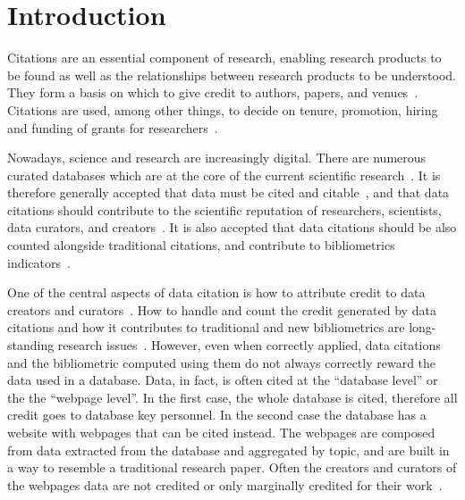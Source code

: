 
\section{Introduction}

Citations are an essential component of research, enabling research products to be found as well as the relationships between research products to be understood. 
They form a basis on which to give credit to authors, papers, and venues~\citep{ZouP16, cousijn2019bringing, cronin1984}.
Citations are used, among other things, to decide on tenure, promotion, hiring and funding of grants for researchers~\citep{meho2007impact, Cronin01, Hartley17, Kosten16}.

Nowadays, science and research are increasingly digital. There are numerous curated databases which are at the core of the current scientific research~\citep{bunemann2016citation}.
It is therefore generally accepted that data must be cited and citable~\citep{LawrenceEtAl2011,CallaghanDPTCKABBLLMHSWW12}, and that data citations should contribute to the scientific reputation of researchers, scientists, data curators, and creators~\citep{AltmanEtAl2015,Spengler2012}.
It is also accepted that data citations should be also counted alongside traditional citations, and contribute to bibliometrics indicators~\citep{Belter2014,Peters2016}.

One of the central aspects of data citation is how to attribute credit to data creators and curators~\citep{buneman2019summ}. 
How to handle and count the credit generated by data citations and how it contributes to traditional and new bibliometrics are long-standing research issues~\citep{garfield1999journal,Borgman2016}.
However, even when correctly applied, data citations and the bibliometric computed using them do not always correctly reward the data used in a database.
Data, in fact, is often cited at the ``database level'' or the the ``webpage level''. 
In the first case, the whole database is cited, therefore all credit goes to database key personnel.
In the second case the database has a website with webpages that can be cited instead. 
The webpages are composed from data extracted from the database and aggregated by topic, and are built in a way to resemble a traditional research paper.
Often the creators and curators of the webpages data are not credited or only marginally credited for their work~\citep{AlawiniDSTW17}.


